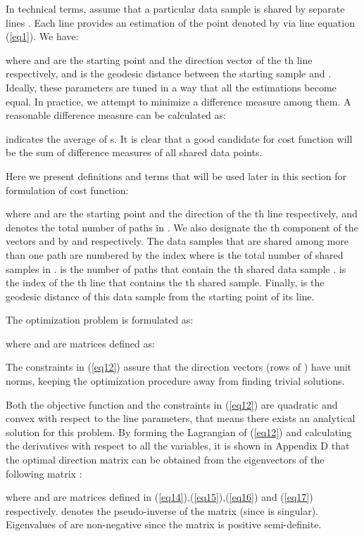 \documentclass[10pt,journal,cspaper,compsoc]{IEEEtran}
\begin{document}
In technical terms, assume that a particular data sample  is shared by  separate lines . Each line provides an estimation of the point denoted by  via line equation (\ref{eq1}). We have:

where  and  are the starting point and the direction vector of the th line respectively, and  is the geodesic distance between the starting sample and . Ideally, these parameters are tuned in a way that all the estimations become equal. In practice, we attempt to minimize a difference measure among them. A reasonable difference measure can be calculated as:

 indicates the average of s. It is clear that a good candidate for cost function will be the sum of difference measures of all shared data points. 

Here we present definitions and terms that will be used later in this section for formulation of cost function:

where  and  are the starting point and the direction of the th line respectively, and  denotes the total number of paths in . We also designate the th component of the vectors  and  by  and  respectively. The data samples that are shared among more than one path are numbered by the index  where  is the total number of shared samples in .  is the number of paths that contain the th shared data sample .  is the index of the th line  that contains the th shared sample. Finally,  is the geodesic distance of this data sample from the starting point of its line.

The optimization problem is formulated as:


where  and  are  matrices defined as:


The constraints in (\ref{eq12}) assure that the direction vectors (rows of ) have unit norms, keeping the optimization procedure away from finding trivial solutions.

Both the objective function and the constraints in (\ref{eq12}) are quadratic and convex with respect to the line parameters, that means there exists an analytical solution for this problem. By forming the Lagrangian of (\ref{eq12}) and calculating the derivatives with respect to all the variables, it is shown in Appendix D that the optimal direction matrix  can be obtained from the eigenvectors of the following matrix :

where  and  are  matrices defined in (\ref{eq14}),(\ref{eq15}),(\ref{eq16}) and (\ref{eq17}) respectively.  denotes the pseudo-inverse of the matrix  (since  is singular). Eigenvalues of  are non-negative since the matrix is positive semi-definite. 
\end{document}
